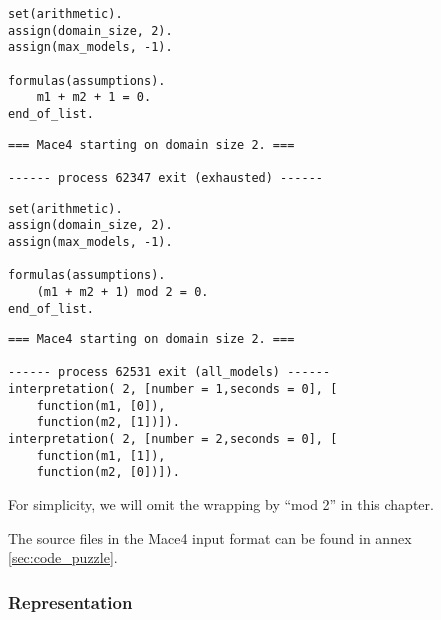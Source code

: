 \begin{multicols}{2}

\begin{lstlisting}[numbers=none,title=Input file that cannot be solved by Mace4]
set(arithmetic).
assign(domain_size, 2).
assign(max_models, -1).

formulas(assumptions). 
    m1 + m2 + 1 = 0.
end_of_list.
\end{lstlisting}

\columnbreak

\begin{lstlisting}[numbers=none,title=Mace4 output]
=== Mace4 starting on domain size 2. ===

------ process 62347 exit (exhausted) ------
\end{lstlisting}

\end{multicols}


\begin{multicols}{2}

\begin{lstlisting}[numbers=none,title=Input file made to be solvable by Mace4]
set(arithmetic).
assign(domain_size, 2).
assign(max_models, -1).

formulas(assumptions). 
    (m1 + m2 + 1) mod 2 = 0.
end_of_list.
\end{lstlisting}

\columnbreak

\begin{lstlisting}[numbers=none,title=Mace4 output]
=== Mace4 starting on domain size 2. ===

------ process 62531 exit (all_models) ------
interpretation( 2, [number = 1,seconds = 0], [
    function(m1, [0]),
    function(m2, [1])]).
interpretation( 2, [number = 2,seconds = 0], [
    function(m1, [1]),
    function(m2, [0])]).
\end{lstlisting}

\end{multicols}

For simplicity, we will omit the wrapping by ``mod 2'' in this chapter.

The source files in the Mace4 input format can be found in annex \ref{sec:code_puzzle}.






\subsubsection{Representation}


